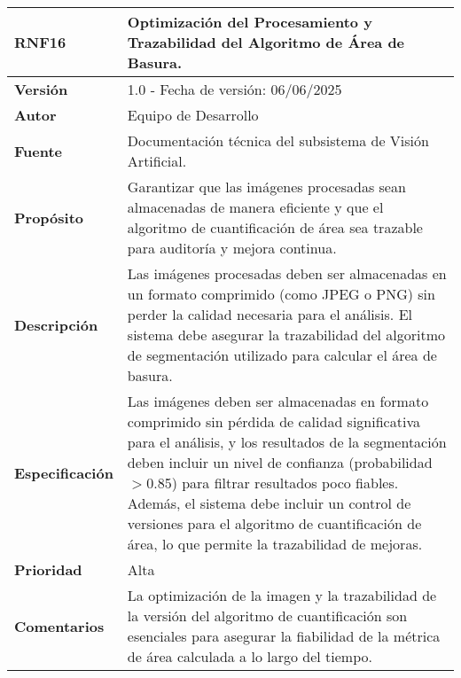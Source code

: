 \begin{longtable}{|l|p{12cm}|}
\hline
\textbf{RNF16} & \textbf{Optimización del Procesamiento y Trazabilidad del Algoritmo de Área de Basura.} \\
\hline
\endfirsthead
\hline
\textbf{Versión} & 1.0 - Fecha de versión: 06/06/2025 \\
\hline
\textbf{Autor} & Equipo de Desarrollo \\
\hline
\textbf{Fuente} & Documentación técnica del subsistema de Visión Artificial. \\
\hline
\textbf{Propósito} & Garantizar que las imágenes procesadas sean almacenadas de manera eficiente y que el algoritmo de cuantificación de área sea trazable para auditoría y mejora continua. \\
\hline
\textbf{Descripción} & Las imágenes procesadas deben ser almacenadas en un formato comprimido (como JPEG o PNG) sin perder la calidad necesaria para el análisis. El sistema debe asegurar la trazabilidad del algoritmo de segmentación utilizado para calcular el área de basura. \\
\hline
\textbf{Especificación} & Las imágenes deben ser almacenadas en formato comprimido sin pérdida de calidad significativa para el análisis, y los resultados de la segmentación deben incluir un nivel de confianza (probabilidad$>$0.85) para filtrar resultados poco fiables. Además, el sistema debe incluir un control de versiones para el algoritmo de cuantificación de área, lo que permite la trazabilidad de mejoras. \\
\hline
\textbf{Prioridad} & Alta \\
\hline
\textbf{Comentarios} & La optimización de la imagen y la trazabilidad de la versión del algoritmo de cuantificación son esenciales para asegurar la fiabilidad de la métrica de área calculada a lo largo del tiempo. \\
\hline
\end{longtable}

